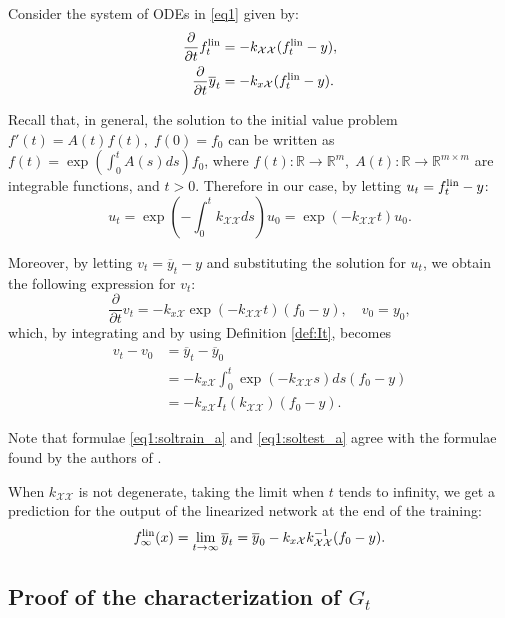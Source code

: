 \documentclass{article}
\theoremstyle{definition}
\theoremstyle{remark}
\numberwithin{equation}{section}
\newcommand{\X}{\mathcal{X}}
\newcommand{\R}{\mathbb{R}}
\newcommand{\ktest}{k_{x\X}}
\newcommand{\ktrain}{k_{\X\X}}
\newcommand{\lin}{{\textup{lin}}}
\begin{document}
Consider the system of ODEs in \eqref{eq1} given by:
\begin{align}
    \frac{\partial}{\partial t} f^\lin_t &= - \ktrain(f^\lin _t-y),\\
    \frac{\partial}{\partial t} {\overline y_t} &= -\ktest(f^\lin_t-y).
\end{align}

Recall that, in general, the solution to the initial value problem $f'(t)=A(t)f(t),\; f(0)=f_0$ can be written as $f(t) = \exp(\int_0^tA(s)ds)f_0$,
where $f(t)\colon \R \to \R^m, \; A(t) \colon \R\to \R^{m \times m}$ are integrable functions, and $t > 0$. 
Therefore in our case, by letting $u_t = f^\lin_t-y$:
\begin{equation}
\label{eq1:soltrain_a}
    u_t = \exp\left(-\int_0^t\ktrain ds\right)u_0 =\exp(-\ktrain t)u_0.
\end{equation}

Moreover, by letting $v_t = \overline y_t-y$ and substituting the solution for $u_t$, we obtain the following expression for $v_t$:
\[
\frac{\partial}{\partial t} v_t = -\ktest\exp(-\ktrain t)(f_0-y), \quad v_0 = y_0,
\]
which, by integrating and by using Definition \ref{def:It}, becomes
\begin{align}
    v_t - v_0 &= \overline y_t - \overline y_0 \\
    &= - \ktest \int_0^t \exp\left(-\ktrain s\right)ds (f_0 -y)\\
    \label{eq1:soltest_a} &= -\ktest I_t(\ktrain)(f_0-y).
\end{align}

Note that formulae \eqref{eq1:soltrain_a} and \eqref{eq1:soltest_a} agree with the formulae found by the authors of \cite{Lee2020}.

When $\ktrain$ is not degenerate, taking the limit when $t$ tends to infinity, we get a prediction for the output of the linearized network at the end of the training:
\[
    f^\lin_\infty(x) = \lim_{t \to \infty}\overline y_t = \overline y_0-\ktest \ktrain^{-1}(f_0-y).
\]



\subsection{Proof of the characterization of $G_t$}
\label{ap:sub:proofGt}
\end{document}
